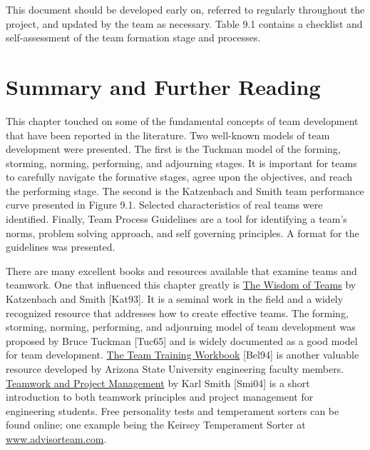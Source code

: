 This document should be developed early on, referred to regularly
throughout the project, and updated by the team as necessary. Table 9.1
contains a checklist and self-assessment of the team formation stage and
processes.

\section{Summary and Further Reading}
\label{section:summary-and-further-reading}

This chapter touched on some of the fundamental concepts of team
development that have been reported in the literature. Two well-known
models of team development were presented. The first is the Tuckman
model of the forming, storming, norming, performing, and adjourning
stages. It is important for teams to carefully navigate the formative
stages, agree upon the objectives, and reach the performing stage. The
second is the Katzenbach and Smith team performance curve presented in
Figure 9.1. Selected characteristics of real teams were identified.
Finally, Team Process Guidelines are a tool for identifying a team's
norms, problem solving approach, and self governing principles. A format
for the guidelines was presented.

There are many excellent books and resources available that examine
teams and teamwork. One that influenced this chapter greatly is \ul{The
Wisdom of Teams} by Katzenbach and Smith {[}Kat93{]}. It is a seminal
work in the field and a widely recognized resource that addresses how to
create effective teams. The forming, storming, norming, performing, and
adjourning model of team development was proposed by Bruce Tuckman
{[}Tuc65{]} and is widely documented as a good model for team
development. \ul{The Team Training Workbook} {[}Bel94{]} is another
valuable resource developed by Arizona State University engineering
faculty members. \ul{Teamwork and Project Management} by Karl Smith
{[}Smi04{]} is a short introduction to both teamwork principles and
project management for engineering students. Free personality tests and
temperament sorters can be found online; one example being the Keirsey
Temperament Sorter at
\href{http://www.advisorteam.com/}{www.advisorteam.com}.


